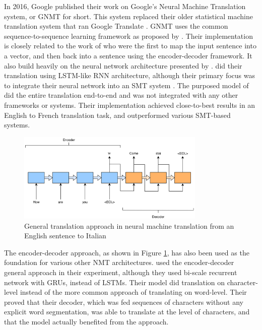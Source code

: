 In 2016, Google published their work on Google's Neural Machine Translation system, or GNMT for short. This system replaced their older statistical machine translation system that ran Google Translate \citep{turovsky2016googletranslatenmt}. GNMT uses the common sequence-to-sequence learning framework as proposed by \citep{sutskever2014sequence, wu2016google}. Their implementation is closely related to the work of \citep{kalchbrenner2013recurrent} who were the first to map the input sentence into a vector, and then back into a sentence using the encoder-decoder framework. It also build heavily on the neural network architecture presented by \citep{cho2014learning}. \citep{cho2014learning} did their translation using LSTM-like RNN architecture, although their primary focus was to integrate their neural network into an SMT system \citep{cho2014learning, sutskever2014sequence}. The purposed model of \citep{sutskever2014sequence} did the entire translation end-to-end and was not integrated with any other frameworks or systems. Their implementation achieved close-to-best results in an English to French translation task, and outperformed various SMT-based systems.

\begin{figure}[ht]
    \centering
    \includegraphics[width=0.8\textwidth]{fig/related_work/encoder_decoder_en_it.png}
    \captionsetup{justification=centering}
    \caption{General translation approach in neural machine translation from an English sentence to Italian}
    \label{fig:machine-translation-encoder-decoder-simple}
\end{figure}

The encoder-decoder approach, as shown in Figure \ref{fig:machine-translation-encoder-decoder-simple}, has also been used as the foundation for various other NMT architectures. \citep{chung2016character} used the encoder-decoder general approach in their experiment, although they used bi-scale recurrent network with GRUs, instead of LSTMs. Their model did translation on character-level instead of the more common approach of translating on word-level. Their proved that their decoder, which was fed sequences of characters without any explicit word segmentation, was able to translate at the level of characters, and that the model actually benefited from the approach. 

